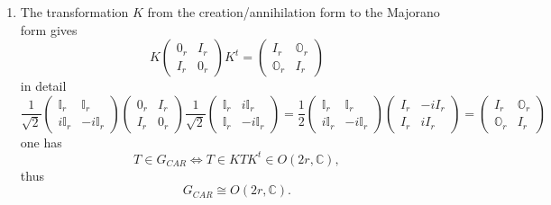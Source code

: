 \documentclass[aps,preprint]{revtex4}
\begin{document}
\begin{enumerate}
\begin{enumerate}
\item The transformation $K$ from the creation/annihilation form to the
Majorano form gives 
\begin{equation}
K\left( 
\begin{array}{cc}
0_{r} & I_{r} \\ 
I_{r} & 0_{r}%
\end{array}%
\right) K^{t}=\left( 
\begin{array}{cc}
I_{r} & \mathbb{O}_{r} \\ 
\mathbb{O}_{r} & I_{r}%
\end{array}%
\right)
\end{equation}%
in detail 
\begin{equation}
\frac{1}{\sqrt{2}}\left( 
\begin{array}{cc}
\mathbb{I}_{r} & \mathbb{I}_{r} \\ 
i\mathbb{I}_{r} & -i\mathbb{I}_{r}%
\end{array}%
\right) \left( 
\begin{array}{cc}
0_{r} & I_{r} \\ 
I_{r} & 0_{r}%
\end{array}%
\right) \frac{1}{\sqrt{2}}\left( 
\begin{array}{cc}
\mathbb{I}_{r} & i\mathbb{I}_{r} \\ 
\mathbb{I}_{r} & -i\mathbb{I}_{r}%
\end{array}%
\right) =\frac{1}{2}\left( 
\begin{array}{cc}
\mathbb{I}_{r} & \mathbb{I}_{r} \\ 
i\mathbb{I}_{r} & -i\mathbb{I}_{r}%
\end{array}%
\right) \left( 
\begin{array}{cc}
I_{r} & -iI_{r} \\ 
I_{r} & iI_{r}%
\end{array}%
\right) =\left( 
\begin{array}{cc}
I_{r} & \mathbb{O}_{r} \\ 
\mathbb{O}_{r} & I_{r}%
\end{array}%
\right)
\end{equation}%
one has 
\begin{equation}
T\in G_{CAR}\Leftrightarrow T\in KTK^{t}\in O\left( 2r,\mathbb{C}\right) ,
\end{equation}%
thus 
\begin{equation}
G_{CAR}\cong O\left( 2r,\mathbb{C}\right) .
\end{equation}


\end{enumerate}
\end{enumerate}
\end{document}
